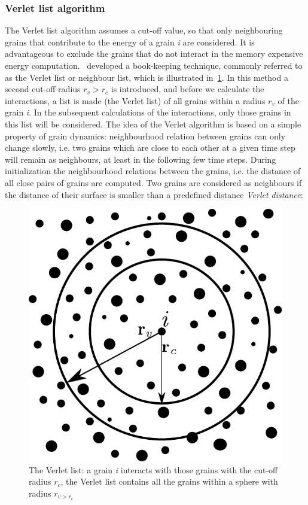 \subsubsection{Verlet list algorithm}
The Verlet list algorithm assumes a cut-off value, so that only neighbouring 
grains that contribute to the energy of a grain \textit{i} are 
considered. It is advantageous to exclude the grains that do not interact in 
the memory expensive energy computation.~\citet{Verlet1967} 
developed a book-keeping technique, commonly referred to as the Verlet list or 
neighbour list, which is illustrated in~\ref{fig:Verletb}. In this method a 
second cut-off radius $r_{\mathit{v}}>r_{c}$ is introduced, and before we 
calculate the interactions, a list is made (the Verlet list) of all grains 
within a radius $r_{\mathit{v}}$ of the grain \textit{i}. In the 
subsequent calculations of the interactions, only those grains in this list 
will be considered. The idea of the Verlet algorithm is based on a simple 
property of grain dynamics: neighbourhood relation between grains can 
only change slowly, i.e. two grains which are close to each other 
at a given time step will remain as neighbours, at least in the following few 
time steps. During initialization the neighbourhood relations between the 
grains, i.e. the distance of all close 
pairs of grains are computed. Two grains are considered as neighbours if 
the distance of 
their surface is smaller than a predefined distance \textit{Verlet distance}:
\begin{figure}[htbp]	
\centering
\includegraphics[scale=0.75]{Verletb}
\caption[Verlet list]{The Verlet list: a grain \textit{i} interacts with 
those grains with 
the cut-off radius $r_{c}$, the Verlet list contains all the grains within 
a sphere with radius 
$r_{\mathit{v}>r_{c}}$}
\label{fig:Verletb}
\end{figure}
